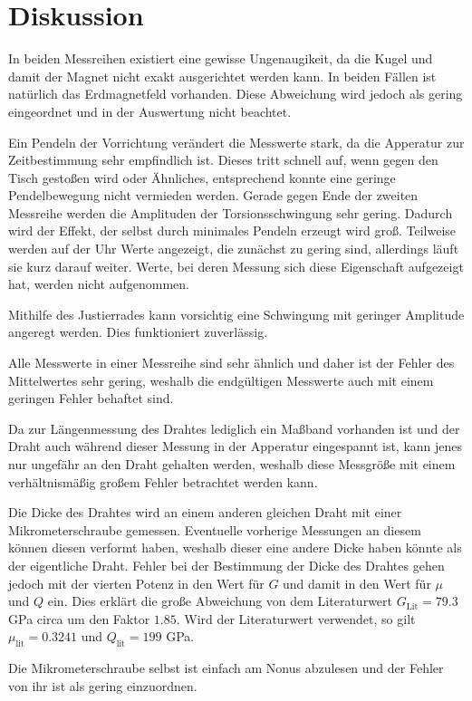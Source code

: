 \section{Diskussion}
\label{sec:Diskussion}

In beiden Messreihen existiert eine gewisse Ungenaugikeit, da die Kugel und damit der Magnet nicht exakt ausgerichtet werden kann.
In beiden Fällen ist natürlich das Erdmagnetfeld vorhanden. Diese Abweichung wird jedoch als gering eingeordnet und in der Auswertung nicht beachtet.

Ein Pendeln der Vorrichtung verändert die Messwerte stark, da die Apperatur zur Zeitbestimmung sehr empfindlich ist. Dieses tritt schnell auf, wenn gegen den Tisch gestoßen wird oder Ähnliches, entsprechend konnte eine geringe Pendelbewegung nicht vermieden werden.
Gerade gegen Ende der zweiten Messreihe werden die Amplituden der Torsionsschwingung sehr gering. Dadurch wird der Effekt, der selbst durch minimales Pendeln erzeugt wird groß.
Teilweise werden auf der Uhr Werte angezeigt, die zunächst zu gering sind, allerdings läuft sie kurz darauf weiter.
Werte, bei deren Messung sich diese Eigenschaft aufgezeigt hat, werden nicht aufgenommen.

Mithilfe des Justierrades kann vorsichtig eine Schwingung mit geringer Amplitude angeregt werden. Dies funktioniert zuverlässig.

Alle Messwerte in einer Messreihe sind sehr ähnlich und daher ist der Fehler des Mittelwertes sehr gering, weshalb die endgültigen Messwerte auch mit einem geringen Fehler behaftet sind.

Da zur Längenmessung des Drahtes lediglich ein Maßband vorhanden ist und der Draht auch während dieser Messung in der Apperatur eingespannt ist, kann jenes nur ungefähr an den Draht gehalten werden, weshalb diese Messgröße mit einem verhältnismäßig großem Fehler betrachtet werden kann.

Die Dicke des Drahtes wird an einem anderen gleichen Draht mit einer Mikrometerschraube gemessen. 
Eventuelle vorherige Messungen an diesem können diesen verformt haben, weshalb dieser eine andere Dicke haben könnte als der eigentliche Draht.
Fehler bei der Bestimmung der Dicke des Drahtes gehen jedoch mit der vierten Potenz in den Wert für $G$ und damit in den Wert für $\mu$ und $Q$ ein.
Dies erklärt die große Abweichung von dem Literaturwert $G_\text{Lit} = 79.3$ GPa \cite{G-stahl} circa um den Faktor $1.85$. Wird der Literaturwert verwendet, so gilt $\mu_\text{lit} = 0.3241$ und $Q_\text{lit} = 199$ GPa.

Die Mikrometerschraube selbst ist einfach am Nonus abzulesen und der Fehler von ihr ist als gering einzuordnen.
